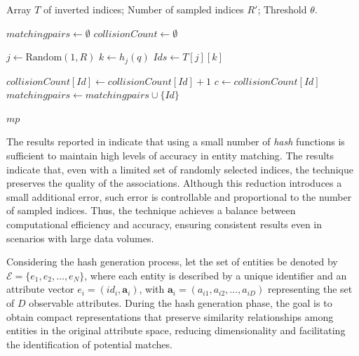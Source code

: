 \documentclass{ieeeaccess}
\begin{document}
\begin{algorithm}[h]
\caption{Resolving a query record $q$ using AB}
\label{alg:approx_blocking}
\begin{algorithmic}[1]

\Require Array $T$ of inverted indices; Number of sampled indices $R'$; Threshold $\theta$.

\State $matchingpairs \gets \emptyset$
\State $collisionCount \gets \emptyset$ 

    \State $j \gets \text{Random}(1, R)$
    \State $k \gets h_j(q)$ 
    \State $Ids \gets T[j][k]$ 

            \State $collisionCount[Id] \gets collisionCount[Id] + 1$
        \EndIf
        \State $c \gets collisionCount[Id]$
            \State $matchingpairs \gets matchingpairs \cup \{Id\}$
        \EndIf
    \EndFor
\EndFor

\State \Return $mp$

\end{algorithmic}
\end{algorithm}

The results reported in \cite{10.1109/TKDE.2024.3361022} indicate that using a small number of \textit{hash} functions is sufficient to maintain high levels of accuracy in entity matching. The results indicate that, even with a limited set of randomly selected indices, the technique preserves the quality of the associations. Although this reduction introduces a small additional error, such error is controllable and proportional to the number of sampled indices. Thus, the technique achieves a balance between computational efficiency and accuracy, ensuring consistent results even in scenarios with large data volumes.

Considering the hash generation process, let the set of entities be denoted by \( \mathcal{E} = \{ e_1, e_2, \dots, e_N \} \), where each entity is described by a unique identifier and an attribute vector \( e_i = (id_i, \mathbf{a}_i) \), with \( \mathbf{a}_i = (a_{i1}, a_{i2}, \dots, a_{iD}) \) representing the set of \( D \) observable attributes. During the hash generation phase, the goal is to obtain compact representations that preserve similarity relationships among entities in the original attribute space, reducing dimensionality and facilitating the identification of potential matches.
\end{document}
